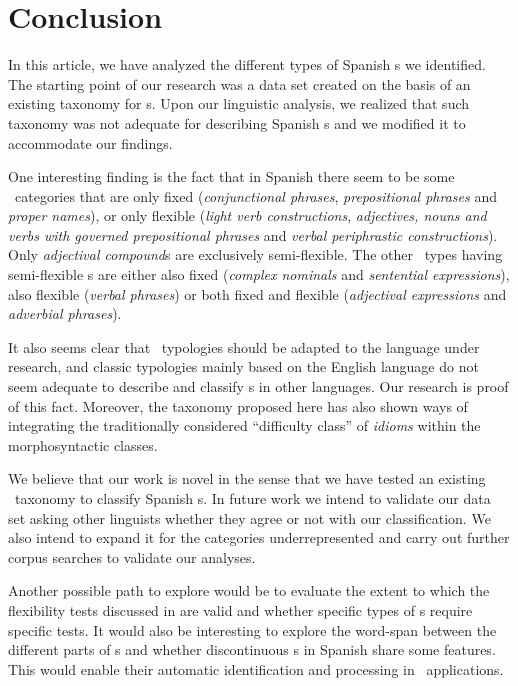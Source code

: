 \documentclass[output=paper]{langsci/langscibook}
\begin{document}
\section{Conclusion}
\label{sec:conclusion}

\largerpage 
{}
In this article, we have analyzed the different types of Spanish \mwe s we identified.
The starting point of our research was a data set created on the basis of an existing taxonomy for \mwe s.
Upon our linguistic analysis, we realized that such taxonomy was not adequate for describing Spanish \mwe s and we modified it to accommodate our findings.

One interesting finding is the fact that in Spanish there seem to be some \mwe\ categories that are only fixed (\textit{conjunctional phrases}, \textit{prepositional phrases} and \textit{proper names}), or only flexible (\textit{light verb constructions}, \textit{adjectives, nouns and verbs with governed prepositional phrases} and \textit{verbal periphrastic constructions}).
Only \textit{adjectival compound}s are exclusively semi-flexible.
The other \mwe\ types having semi-flexible \mwe s are either also fixed (\textit{complex nominals} and \textit{sentential expressions}), also flexible (\textit{verbal phrases}) or both fixed and flexible (\textit{adjectival expressions} and \textit{adverbial phrases}).

It also seems clear that \mwe\ typologies should be adapted to the language under research, and classic typologies mainly based on the English language do not seem adequate to describe and classify \mwe s in other languages.
Our research is proof of this fact.
Moreover, the taxonomy proposed here has also shown ways of integrating the traditionally considered ``difficulty class'' of \textit{idioms} within the morphosyntactic classes.

We believe that our work is novel in the sense that we have tested an existing \mwe\ taxonomy to classify Spanish \mwe s.
In future work we intend to validate our data set asking other linguists whether they agree or not with our classification.
We also intend to expand it for the categories underrepresented and carry out further corpus searches to validate our analyses.

Another possible path to explore would be to evaluate the extent to which the flexibility tests discussed in  are valid and whether specific types of \mwe s require specific tests.
It would also be interesting to explore the word-span between the different parts of \mwe s and whether discontinuous \mwe s in Spanish share some features.
This would enable their automatic identification and processing in \nlp\ applications.
\end{document}

